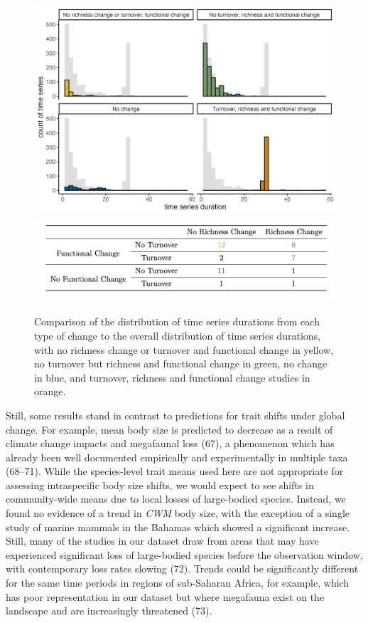 \documentclass{article}
\begin{document}
\begin{figure}
\includegraphics[width=\textwidth]{../../figures/duration_hist} \includegraphics[width=\textwidth]{../../figures/functional_change_table} \caption{Comparison of the distribution of time series durations from each type of change to the overall distribution of time series durations, with no richness change or turnover and functional change in yellow, no turnover but richness and functional change in green, no change in blue, and turnover, richness and functional change studies in orange.}\label{fig:changeScenarios}
\end{figure}

Still, some results stand in contrast to predictions for trait shifts
under global change. For example, mean body size is predicted to
decrease as a result of climate change impacts and megafaunal loss (67),
a phenomenon which has already been well documented empirically and
experimentally in multiple taxa (68--71). While the species-level trait
means used here are not appropriate for assessing intraspecific body
size shifts, we would expect to see shifts in community-wide means due
to local losses of large-bodied species. Instead, we found no evidence
of a trend in \emph{CWM} body size, with the exception of a single study
of marine mammals in the Bahamas which showed a significant increase.
Still, many of the studies in our dataset draw from areas that may have
experienced significant loss of large-bodied species before the
observation window, with contemporary loss rates slowing (72). Trends
could be significantly different for the same time periods in regions of
sub-Saharan Africa, for example, which has poor representation in our
dataset but where megafauna exist on the landscape and are increasingly
threatened (73).
\end{document}
